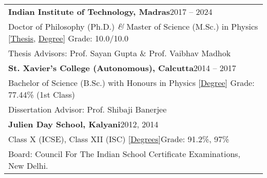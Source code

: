 
\noindent
\begin{tabular}{@{} m{18.5cm}}
\textbf{Indian Institute of Technology, Madras}\hfill 2017 -- 2024\\
Doctor of Philosophy (Ph.D.) \textit{\&} Master of Science (M.Sc.) in Physics [\href{https://shodhganga.inflibnet.ac.in/handle/10603/609844}{Thesis}, \href{https://drive.google.com/file/d/1e_EdV3adnDxSkRCMAQGF4_j8DAEQHmok/view?usp=sharing}{Degree}] \hfill Grade: 10.0/10.0\\
Thesis Advisors: Prof. Sayan Gupta \& Prof. Vaibhav Madhok\\[0.3cm]

\textbf{St. Xavier's College (Autonomous), Calcutta}\hfill 2014 -- 2017\\
Bachelor of Science (B.Sc.) with Honours in Physics [\href{https://drive.google.com/file/d/1kzH1EiCFbbcnvpbOTWJMMhiCC53tkvDD/view?usp=sharing}{Degree}] \hfill Grade: 77.44\% (1st Class)\\
Dissertation Advisor: Prof. Shibaji Banerjee\\[0.3cm]

\textbf{Julien Day School, Kalyani}\hfill 2012, 2014\\
Class X (ICSE), Class XII (ISC) [\href{https://drive.google.com/file/d/1rBzB5cY0d9NKxEajnIj6dx8uzIBc41sh/view?usp=sharing}{Degrees}]\hfill Grade: 91.2\%, 97\%\\
Board: Council For The Indian School Certificate Examinations, New Delhi.
\end{tabular}